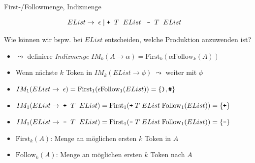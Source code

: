 \documentclass{beamer}
\begin{document}
\begin{frame}{First-/Followmenge, Indizmenge}
	\footnotesize

	\begin{align*}
		EList \to & \;\; \epsilon \mid \textrm{\texttt{+}} \;\; T \;\; EList \mid \textrm{\texttt{-}} \;\; T \;\; EList
	\end{align*}
	
	Wie können wir bspw. bei $EList$ entscheiden, welche Produktion anzuwenden ist?
	\pause
	\begin{itemize}
		\item $\leadsto$ definiere \emph{Indizmenge} $IM_k(A \to \alpha) = \textrm{First}_k(\alpha \textrm{Follow}_k(A))$
		\item Wenn nächste $k$ Token in $IM_k(EList \to \phi)$ $\leadsto$ weiter mit $\phi$
		\pause
		\item $IM_1(EList \to \; \epsilon) = \textrm{First}_1(\epsilon \textrm{Follow}_1(EList)) = \{ \textrm{\texttt{)}}, \textrm{\texttt{\#}} \}$
		\item $IM_1(EList \to \; \textrm{\texttt{+}} \;\; T \;\; EList) = \textrm{First}_1(\textrm{\texttt{+}} \; T \; EList \; \textrm{Follow}_1(EList)) = \{ \textrm{\texttt{+}} \}$
		\item $IM_1(EList \to \; \textrm{\texttt{-}} \;\; T \;\; EList) = \textrm{First}_1(\textrm{\texttt{-}} \; T \; EList \; \textrm{Follow}_1(EList)) = \{ \textrm{\texttt{-}} \}$
		\pause
		\item $\textrm{First}_k(A)$: Menge an möglichen ersten $k$ Token in $A$
		\item $\textrm{Follow}_k(A)$: Menge an möglichen ersten $k$ Token nach $A$
	\end{itemize}
\end{frame}
\end{document}
